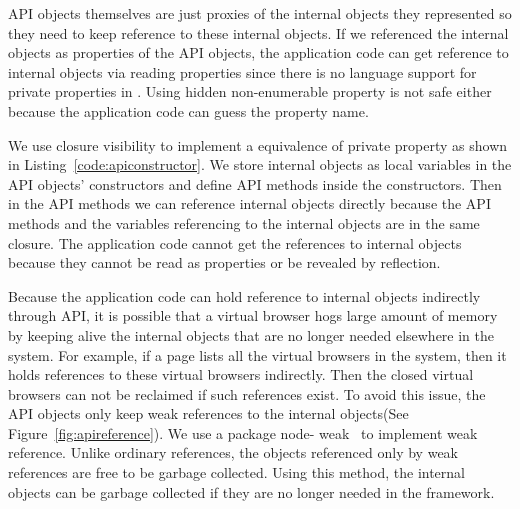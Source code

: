 API objects themselves are just proxies of the internal objects they
represented so they need to keep reference to these internal objects. If we
referenced the internal objects as properties of the API objects, the
application code can get reference to internal objects via reading
properties  since there is no language support for private properties in \js.
Using hidden non-enumerable property is not safe either because the
application code can guess the property name.

We use closure visibility to implement a equivalence of private property as
shown in Listing~\ref{code:apiconstructor}. We store internal objects as local
variables in the API objects' constructors and define API methods inside the
constructors. Then in the API methods we can reference internal objects
directly because the API methods and the variables referencing to the internal
objects are in the same closure. The application code cannot get the
references to internal objects because they cannot be read as properties or be
revealed by reflection.




Because the application code can hold reference to internal objects indirectly
through API, it is possible that a virtual browser hogs large amount of memory
by keeping alive the internal objects that are no longer needed elsewhere in
the system.  For example, if a page lists all the virtual browsers in the
system, then it holds references to these virtual browsers indirectly. Then
the closed virtual browsers can not be reclaimed if such references exist.
To avoid this issue, the API objects only keep weak references to the internal
objects(See Figure~\ref{fig:apireference}). We use a \nodejs{} package node-
weak~\cite{nodeweak} to implement weak reference. Unlike ordinary references,
the objects referenced only by weak references are free to be garbage
collected. Using this method, the internal objects can be garbage collected
if they are no longer needed in the framework.


